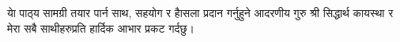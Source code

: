 \begin{titlepage}
\newpage
\vspace*{\fill}
\thispagestyle{empty}

\newpage
\vspace*{\fill}
\thispagestyle{empty}
\begin{center}
	\begin{nepali}
			{\large {याे पाठ्‍य सामग्री तयार पार्न साथ, सहयोग र हाैसला प्रदान गर्नुहुने आदरणीय गुरु श्री सिद्धार्थ कायस्था र मेरा सबै साथीहरुप्रति हार्दिक आभार प्रकट गर्दछु।}}
	\end{nepali}
\end{center}
\vspace*{\fill}

\end{titlepage}
